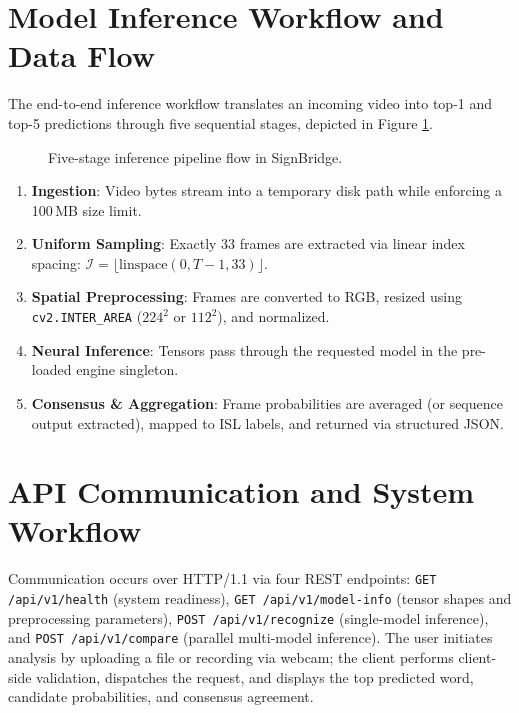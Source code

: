 \section{Model Inference Workflow and Data Flow}
\label{sec:inference_workflow}
The end-to-end inference workflow translates an incoming video into top-1 and top-5 predictions through five sequential stages, depicted in Figure \ref{fig:pipeline_flow}.

\begin{figure}[htbp]
\centering

\caption{Five-stage inference pipeline flow in SignBridge.}
\label{fig:pipeline_flow}
\end{figure}

\begin{enumerate}
    \item \textbf{Ingestion}: Video bytes stream into a temporary disk path while enforcing a 100\,MB size limit.
    \item \textbf{Uniform Sampling}: Exactly 33 frames are extracted via linear index spacing: $\mathcal{I} = \lfloor \text{linspace}(0, T-1, 33) \rfloor$.
    \item \textbf{Spatial Preprocessing}: Frames are converted to RGB, resized using \texttt{cv2.INTER\_AREA} ($224^2$ or $112^2$), and normalized.
    \item \textbf{Neural Inference}: Tensors pass through the requested model in the pre-loaded engine singleton.
    \item \textbf{Consensus & Aggregation}: Frame probabilities are averaged (or sequence output extracted), mapped to ISL labels, and returned via structured JSON.
\end{enumerate}

\section{API Communication and System Workflow}
\label{sec:api_comm}
Communication occurs over HTTP/1.1 via four REST endpoints: \texttt{GET /api/v1/health} (system readiness), \texttt{GET /api/v1/model-info} (tensor shapes and preprocessing parameters), \texttt{POST /api/v1/recognize} (single-model inference), and \texttt{POST /api/v1/compare} (parallel multi-model inference). The user initiates analysis by uploading a file or recording via webcam; the client performs client-side validation, dispatches the request, and displays the top predicted word, candidate probabilities, and consensus agreement.
